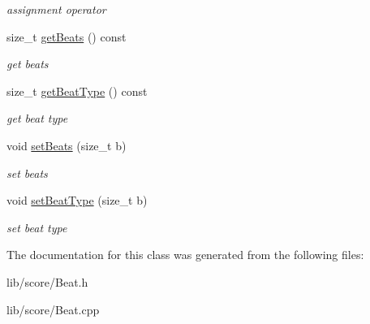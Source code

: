 \begin{DoxyCompactItemize}
\begin{DoxyCompactList}\small\item\em assignment operator \end{DoxyCompactList}\item 
\hypertarget{classsinsy_1_1Beat_a546c7bc157b7dc97b457f673b1f28689}{size\-\_\-t \hyperlink{classsinsy_1_1Beat_a546c7bc157b7dc97b457f673b1f28689}{get\-Beats} () const }\label{classsinsy_1_1Beat_a546c7bc157b7dc97b457f673b1f28689}

\begin{DoxyCompactList}\small\item\em get beats \end{DoxyCompactList}\item 
\hypertarget{classsinsy_1_1Beat_aecc941b5cc357d38329211f6eac0eb0e}{size\-\_\-t \hyperlink{classsinsy_1_1Beat_aecc941b5cc357d38329211f6eac0eb0e}{get\-Beat\-Type} () const }\label{classsinsy_1_1Beat_aecc941b5cc357d38329211f6eac0eb0e}

\begin{DoxyCompactList}\small\item\em get beat type \end{DoxyCompactList}\item 
\hypertarget{classsinsy_1_1Beat_a94363a4bc85c1d8714c96bf0d2db31e7}{void \hyperlink{classsinsy_1_1Beat_a94363a4bc85c1d8714c96bf0d2db31e7}{set\-Beats} (size\-\_\-t b)}\label{classsinsy_1_1Beat_a94363a4bc85c1d8714c96bf0d2db31e7}

\begin{DoxyCompactList}\small\item\em set beats \end{DoxyCompactList}\item 
\hypertarget{classsinsy_1_1Beat_a25ad1552b97491ff595aca8c978f71bf}{void \hyperlink{classsinsy_1_1Beat_a25ad1552b97491ff595aca8c978f71bf}{set\-Beat\-Type} (size\-\_\-t b)}\label{classsinsy_1_1Beat_a25ad1552b97491ff595aca8c978f71bf}

\begin{DoxyCompactList}\small\item\em set beat type \end{DoxyCompactList}\end{DoxyCompactItemize}


\-The documentation for this class was generated from the following files\-:\begin{DoxyCompactItemize}
\item 
lib/score/\-Beat.\-h\item 
lib/score/\-Beat.\-cpp\end{DoxyCompactItemize}
